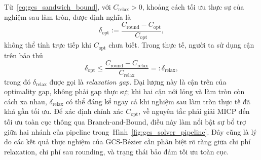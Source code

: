 Từ~\eqref{eq:gcs_sandwich_bound}, với $C_{\mathrm{relax}} > 0$, khoảng cách tối ưu thực sự của nghiệm sau làm tròn, được định nghĩa là
\[
    \delta_{\mathrm{opt}}
    :=
    \frac{C_{\mathrm{round}} - C_{\mathrm{opt}}}{C_{\mathrm{opt}}},
\]
không thể tính trực tiếp khi $C_{\mathrm{opt}}$ chưa biết.
Trong thực tế, người ta sử dụng cận trên bảo thủ
\begin{equation}
    \delta_{\mathrm{opt}}
    \le
    \frac{C_{\mathrm{round}} - C_{\mathrm{relax}}}{C_{\mathrm{relax}}}
    =:
    \delta_{\mathrm{relax}},
    \label{eq:gcs_relax_gap_bound}
\end{equation}
trong đó $\delta_{\mathrm{relax}}$ được gọi là \emph{relaxation gap}.
Đại lượng này là cận trên của optimality gap, không phải gap thực sự; khi hai cận nới lỏng và làm tròn còn cách xa nhau, $\delta_{\mathrm{relax}}$ có thể đáng kể ngay cả khi nghiệm sau làm tròn thực tế đã khá gần tối ưu.
Để xác định chính xác $C_{\mathrm{opt}}$, về nguyên tắc phải giải MICP đến tối ưu toàn cục thông qua Branch-and-Bound, điều này làm nổi bật sự bổ trợ giữa hai nhánh của pipeline trong~Hình~\ref{fig:gcs_solver_pipeline}.
Đây cũng là lý do các kết quả thực nghiệm của GCS-Bézier cần phân biệt rõ ràng giữa chi phí relaxation, chi phí sau rounding, và trạng thái bảo đảm tối ưu toàn cục.
